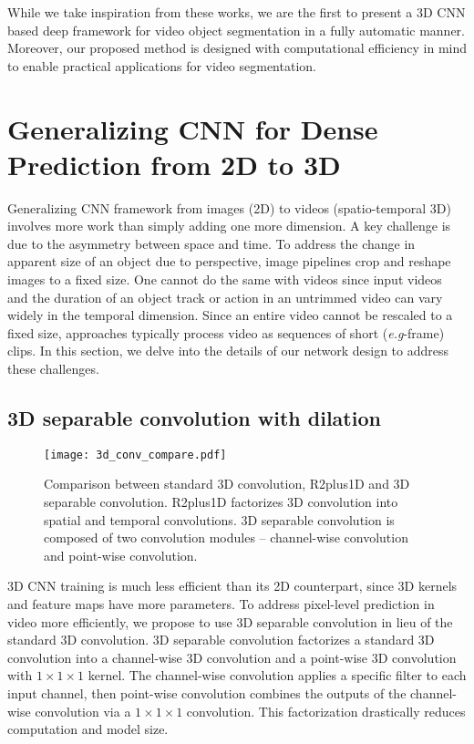 \documentclass{bmvc2k}
\def\eg{\emph{e.g}\bmvaOneDot}
\begin{document}
While we take inspiration from these works, we are the first to present a 3D CNN based deep framework for video object segmentation in a fully automatic manner. Moreover, our proposed method is designed with computational efficiency in mind to enable practical applications for video segmentation.




\section{Generalizing CNN for Dense Prediction from 2D to 3D}
\label{sec:method}
Generalizing CNN framework from  images (2D) to videos (spatio-temporal 3D) involves more work than simply adding one more dimension. A key challenge is due to the asymmetry between space and time. To address the change in apparent size of an object due to perspective, image pipelines crop and reshape images to a fixed size. One cannot do the same with videos since  input videos and the duration of an object track or action in an untrimmed video can vary widely in the temporal dimension. Since an entire video cannot be rescaled to  a fixed size, approaches typically process video as sequences of short (\eg 8-frame) clips.
In this section, we delve into the details of our network design to address these challenges.




\subsection{3D separable convolution with dilation}
\label{sec:3d_separable_conv}
\begin{figure}
\centering
\texttt{[image: 3d\_conv\_compare.pdf]}
\caption{Comparison between standard 3D convolution, R2plus1D and 3D separable convolution. R2plus1D factorizes 3D convolution into spatial and temporal convolutions. 3D separable convolution is composed of two convolution modules -- channel-wise convolution and point-wise convolution. 
}
\label{fig:3d_conv_compare}
\end{figure}
3D CNN training is much less efficient than its 2D counterpart, since 3D kernels and feature maps have more parameters. To address pixel-level prediction in video more efficiently, we propose to use 3D separable convolution in lieu of the standard 3D convolution.
3D separable convolution factorizes a standard 3D convolution into a channel-wise 3D convolution and a point-wise 3D convolution with $1\times1\times1$ kernel. The channel-wise convolution applies a specific filter to each input channel, then point-wise convolution combines the outputs of the channel-wise convolution via a $1\times1\times1$ convolution. This factorization drastically reduces computation and model size.
\end{document}
